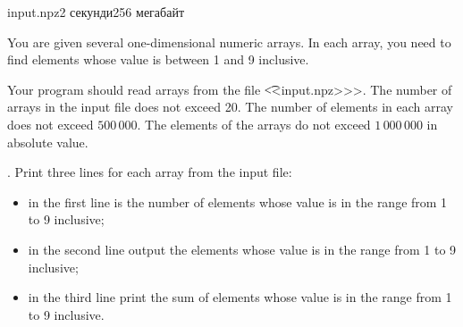 \begin{problem}{}{input.npz}{}{2 секунди}{256 мегабайт}

You are given several one-dimensional numeric arrays. 
In each array, you need to find elements whose value is between 1 and 9 inclusive.

\InputFile
Your program should read arrays from the file {\t {<<input.npz>>>}}.
The number of arrays in the input file does not exceed 20.
The number of elements in each array does not exceed $500\,000$.
The elements of the arrays do not exceed $1\,000\,000$ in absolute value.

\OutputFile.
Print three lines for each array from the input file:
\begin{itemize} 
\item in the first line is the number of elements whose value is in the range from 1 to 9 inclusive;
\item in the second line output the elements whose value is in the range from 1 to 9 inclusive;
\item in the third line print the sum of elements whose value is in the range from 1 to 9 inclusive.
\end{itemize}


\Example
\begin{example}
%
\end{example}

\end{problem}

